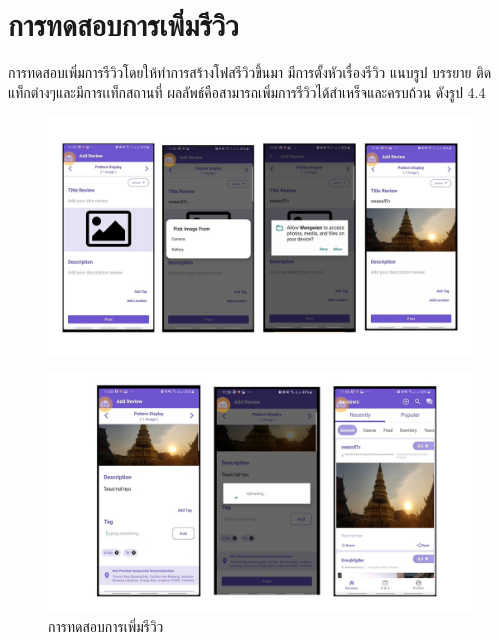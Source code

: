 \section{การทดสอบการเพิ่มรีวิว}
\quad \quad  การทดสอบเพิ่มการรีวิวโดยให้ทำการสร้างโฟสรีวิวขึ้นมา มีการตั้งหัวเรื่องรีวิว แนบรูป บรรยาย ติดแท็กต่างๆและมีการเเท็กสถานที่
ผลลัพธ์คือสามารถเพิ่มการรีวิวได้สำเหร็จและครบถ้วน ดังรูป 4.4
\begin{figure}
    \begin{center}
      \includegraphics[width=1\textwidth]{./image/testing/Slide4.JPG}
    \end{center}
    \end{figure}

    \begin{figure}
        \begin{center}
          \includegraphics[width=1\textwidth]{./image/testing/Slide5.JPG}
        \end{center}
        \caption[การทดสอบการเพิ่มรีวิว]{การทดสอบการเพิ่มรีวิว}
        \end{figure}

